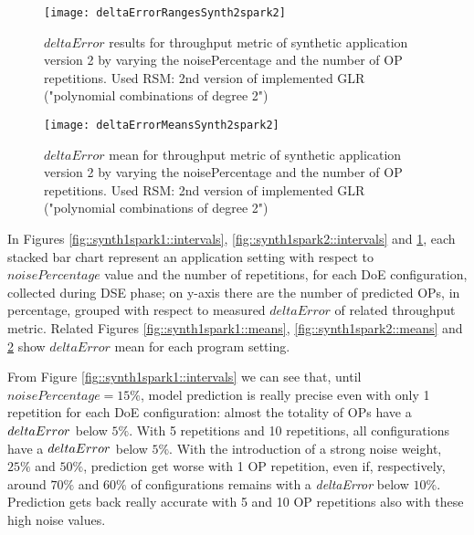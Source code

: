 \begin{figure}[htb]

    \centering
    
    \texttt{[image: deltaErrorRangesSynth2spark2]}
    
     \caption{$deltaError$ results for throughput metric of synthetic application version 2 by varying the noisePercentage and the number of OP repetitions. Used RSM: 2nd version of implemented GLR ("polynomial combinations of degree 2")}
    
    \label{fig::synth2spark2::intervals}
    
\end{figure}

\begin{figure}[htb]

    \centering
    
    \texttt{[image: deltaErrorMeansSynth2spark2]}
    
    \caption{$deltaError$ mean for throughput metric of synthetic application version 2 by varying the noisePercentage and the number of OP repetitions. Used RSM: 2nd version of implemented GLR ("polynomial combinations of degree 2")}
    
    \label{fig::synth2spark2::means}
    
\end{figure}





In Figures \ref{fig::synth1spark1::intervals}, \ref{fig::synth1spark2::intervals} and \ref{fig::synth2spark2::intervals}, each stacked bar chart represent an application setting with respect to $noisePercentage$ value and the number of repetitions, for each DoE configuration, collected during DSE phase; on y-axis there are the number of predicted OPs, in percentage, grouped with respect to measured $deltaError$ of related throughput metric. Related Figures \ref{fig::synth1spark1::means}, \ref{fig::synth1spark2::means} and \ref{fig::synth2spark2::means} show $deltaError$ mean for each program setting.

From Figure \ref{fig::synth1spark1::intervals} we can see that, until $noisePercentage = 15\%$, model prediction is really precise even with only 1 repetition for each DoE configuration: almost the totality of OPs have a $del\-ta\-Er\-ror$ below $5\%$. With 5 repetitions and 10 repetitions, all configurations have a $del\-ta\-Er\-ror$ below $5\%$. With the introduction of a strong noise weight, $25\%$ and $50\%$, prediction get worse with 1 OP repetition, even if, respectively, around $70\%$ and $60\%$ of configurations remains with a \textit{deltaError} below $10\%$. Prediction gets back really accurate with 5 and 10 OP repetitions also with these high noise values.

